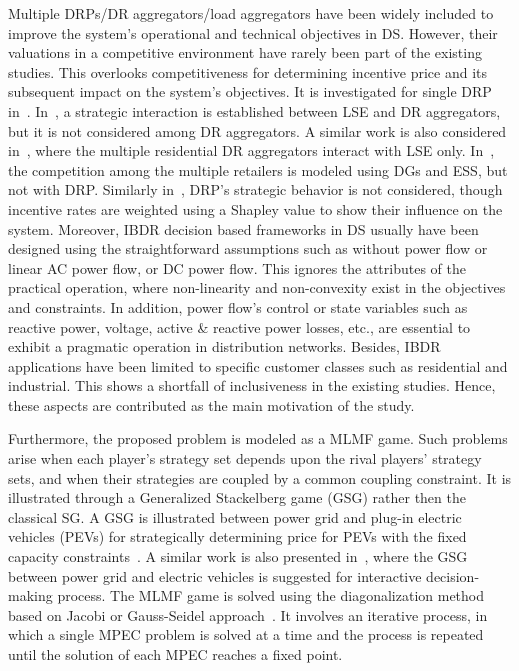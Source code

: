 \documentclass[journal]{IEEEtran}
\begin{document}
Multiple DRPs/DR aggregators/load aggregators have been widely included to improve the system's operational and technical objectives in DS. However, their valuations in a competitive environment have rarely been part of the existing studies. This overlooks competitiveness for determining incentive price and its subsequent impact on the system's objectives. It is investigated for single DRP in~\cite{sarker2014optimal}. In~\cite{wang2019ensuring}, a strategic interaction is established between LSE and DR aggregators, but it is not considered among DR aggregators. A similar work is also considered in~\cite{hu2016framework}, where the multiple residential DR aggregators interact with LSE only. In~\cite{ghazvini2015multi}, the competition among the multiple retailers is modeled using DGs and ESS, but not with DRP. Similarly in~\cite{li2016dynamic}, DRP's strategic behavior is not considered, though incentive rates are weighted using a Shapley value to show their influence on the system. Moreover, IBDR decision based frameworks in DS usually have been designed using the straightforward assumptions such as without power flow\mbox{\cite{hu2016framework,ghazvini2015multi,li2016dynamic}} or linear AC power flow\mbox{\cite{sarker2014optimal}}, or DC power flow\mbox{\cite{wang2019ensuring}}. This ignores the attributes of the practical operation, where non-linearity and non-convexity exist in the objectives and constraints. In addition, power flow's control or state variables such as reactive power, voltage, active \& reactive power losses, etc., are essential to exhibit a pragmatic operation in distribution networks. Besides, IBDR applications have been limited to specific customer classes such as residential and industrial\mbox{\cite{sarker2014optimal,yu2017incentive,pandey2021hierarchical}}.  This shows a shortfall of inclusiveness in the existing studies. Hence, these aspects are contributed as the main motivation of the study. 

Furthermore, the proposed problem is modeled as a MLMF game. Such problems arise when each \mbox{player’s} strategy set depends upon the rival \mbox{players'} strategy sets\mbox{\cite{facchinei2007generalized}}, and when their strategies are coupled by a common coupling constraint. It is illustrated through a Generalized Stackelberg game (GSG) rather then the classical SG\mbox{\cite{pang2005quasi}}. A GSG is illustrated between power grid and plug-in electric vehicles (PEVs) for strategically determining price for PEVs with the fixed capacity constraints~\cite{tushar2012economics}. A similar work is also presented in~\cite{li2018interactive}, where the GSG between power grid and electric vehicles is suggested for interactive decision-making process. The MLMF game is solved using the diagonalization method based on Jacobi or Gauss-Seidel approach~\cite{bautista2007formulation,hobbs2000strategic,cardell1997market}. It involves an iterative process, in which a single MPEC problem is solved at a time and the process is repeated until the solution of each MPEC reaches a fixed point. 
\end{document}
